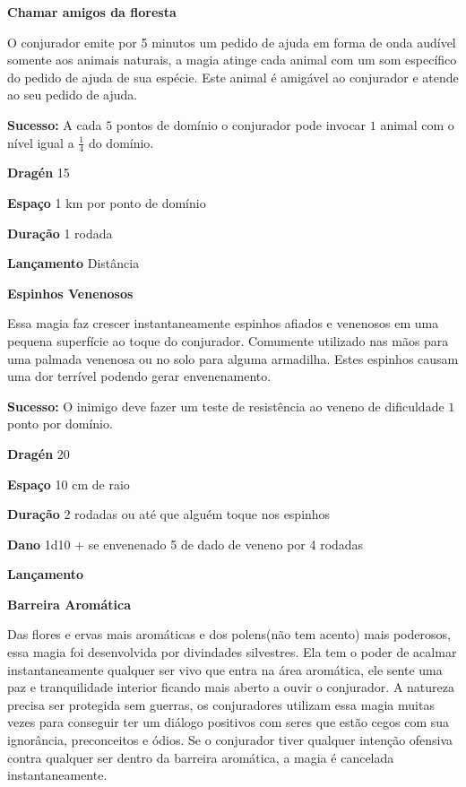 \textbf{Chamar  amigos  da  floresta}

O  conjurador  emite  por  5  minutos  um  pedido  de  ajuda  em  forma  de  onda  audível  somente  aos  
animais  naturais,  a  magia  atinge  cada  animal  com  um  som  específico  do  pedido  de  ajuda  de  sua  espécie.  
Este  animal  é  amigável  ao  conjurador  e  atende  ao  seu  pedido  de  ajuda.

\textbf{Sucesso:} A  cada  $5$  pontos  de  domínio  o  conjurador  pode  invocar $1$  animal  com  o  nível  igual  a  $\frac{1}{4}$  do  domínio.  

\textbf{Dragén} 15

\textbf{Espaço} 1 km por ponto de domínio

\textbf{Duração} 1 rodada

\textbf{Lançamento} Distância
\bigskip

\textbf{Espinhos  Venenosos}

Essa  magia  faz  crescer  instantaneamente  espinhos  afiados  e  venenosos  em  uma  pequena  superfície  
ao  toque  do  conjurador.  Comumente  utilizado  nas  mãos  para uma  palmada  venenosa  ou  no  solo  para  
alguma  armadilha.  Estes  espinhos  causam  uma  dor  terrível  podendo  gerar  envenenamento.  

\textbf{Sucesso:} O  inimigo  deve  fazer  um  teste  de  resistência  ao  veneno  de  dificuldade  $1$  ponto  por  domínio.  

\textbf{Dragén} 20

\textbf{Espaço} 10 cm de raio

\textbf{Duração} 2 rodadas ou até que alguém toque nos espinhos

\textbf{Dano} 1d10 + se envenenado 5 de dado de veneno por 4 rodadas

\textbf{Lançamento}
\bigskip

\textbf{Barreira  Aromática}

Das  flores  e  ervas  mais  aromáticas  e  dos  polens(não tem acento)  mais  poderosos,  essa  magia  foi  desenvolvida  por  
divindades  silvestres.  Ela  tem  o  poder  de  acalmar  instantaneamente  qualquer  ser  vivo  que  entra  na 
área  aromática,  ele  sente  uma  paz  e  tranquilidade  interior  ficando  mais  aberto  a  ouvir  o  conjurador.  A  
natureza  precisa  ser  protegida  sem  guerras,  os  conjuradores  utilizam  essa  magia  muitas  vezes  para  
conseguir  ter  um  diálogo  positivos  com  seres  que  estão  cegos  
com  sua  ignorância,  preconceitos  e  ódios.
Se  o  conjurador  tiver  qualquer  intenção  ofensiva  contra  
qualquer  ser  dentro  da  barreira  aromática,  a  magia  é  cancelada  instantaneamente.  

